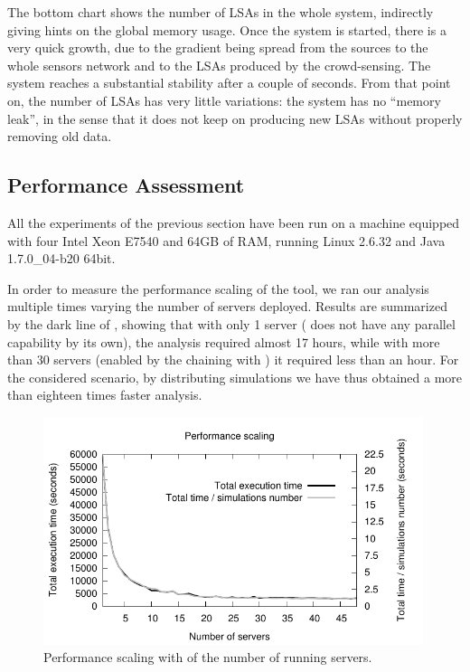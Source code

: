 \documentclass[12pt,a4paper,twoside,openright]{book}
\begin{document}
The bottom chart shows the number of LSAs in the whole system, indirectly giving hints on the global memory usage.
%
Once the system is started, there is a very quick growth, due to the gradient being spread from the sources to the whole sensors network and to the LSAs produced by the crowd-sensing.
%
The system reaches a substantial stability after a couple of seconds.
%
From that point on, the number of LSAs has very little variations: the system has no ``memory leak'', in the sense that it does not keep on producing new LSAs without properly removing old data. 

\subsection{Performance Assessment}
All the experiments of the previous section have been run on a machine equipped with four Intel\textregistered{} Xeon\textregistered{} E7540 and 64GB of RAM, running Linux 2.6.32 and Java 1.7.0\_04-b20 64bit.

In order to measure the performance scaling of the tool, we ran our analysis multiple times varying the number of \multivesta{} servers deployed.
%
Results are summarized by the dark line of , showing that with only 1 server (\alchemist{} does not have any parallel capability by its own), the analysis required almost 17 hours, while with more than 30 servers (enabled by the chaining with \multivesta{}) it required less than an hour. For the considered scenario, by distributing simulations we have thus obtained a more than eighteen times faster analysis.

\begin{figure}[t]
\begin{center}
\vspace{-0.2cm}
 \includegraphics[width=0.99\textwidth]{img/scaling}
 \end{center}
 \caption{Performance scaling with of the number of running servers.}
 \label{img:performance}
\end{figure}
\end{document}
